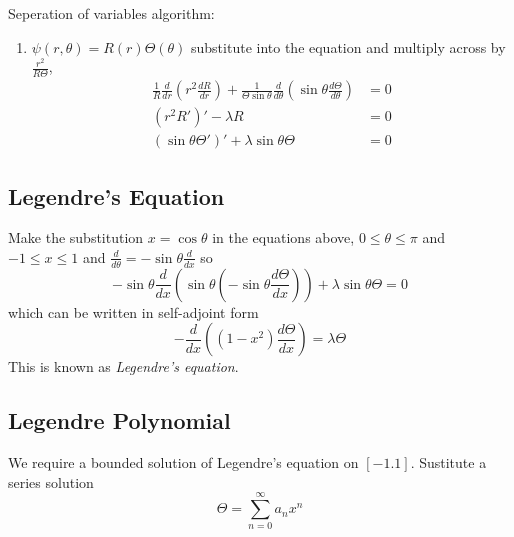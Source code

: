 \documentclass[a4paper]{article}
\begin{document}
Seperation of variables algorithm:

\begin{enumerate}
\item \(\psi(r, \theta) = R(r) \Theta(\theta)\) substitute into the equation and multiply across by \(\frac{r^2}{R\Theta}\),
  \begin{align*}
    \frac{1}{R} \frac{d}{dr} \left( r^2 \frac{dR}{dr} \right) + \frac{1}{\Theta \sin \theta} \frac{d}{d\theta} \left( \sin \theta \frac{d\Theta}{d\theta} \right) &= 0 \\
    (r^2R')' - \lambda R &= 0 \\
    (\sin \theta \Theta')' + \lambda \sin \theta \Theta &= 0
  \end{align*}
\end{enumerate}

\subsection{Legendre's Equation}

Make the substitution \(x = \cos \theta\) in the equations above, \(0 \leq \theta \leq \pi\) and \(-1 \leq x \leq 1\) and \(\frac{d}{d\theta} = -\sin \theta \frac{d}{dx}\) so
\[
  -\sin \theta \frac{d}{dx} ( \sin \theta (- \sin \theta \frac{d\Theta}{dx})) + \lambda \sin\theta \Theta = 0
\]
which can be written in self-adjoint form
\[
  -\frac{d}{dx} \left( (1 - x^2) \frac{d\Theta}{dx} \right) = \lambda \Theta
\]
This is known as \emph{Legendre's equation}.

\subsection{Legendre Polynomial}

We require a bounded solution of Legendre's equation on \([-1. 1]\). Sustitute a series solution
\[
  \Theta = \sum_{n = 0}^{\infty} a_n x^n
\]
\end{document}
